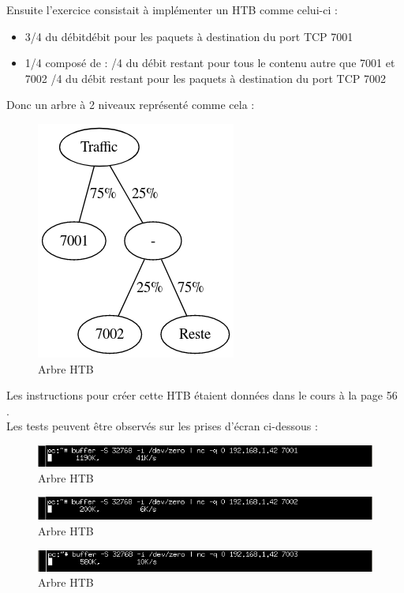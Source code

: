 \documentclass{article}
\begin{document}
Ensuite l'exercice consistait à implémenter un HTB comme celui-ci : \\

\begin{itemize}
	\item 3/4 du débitdébit pour les paquets à destination du port TCP 7001
	\item 1/4 composé de : 
	/4 du débit restant pour tous le contenu autre que 7001 et 7002
	/4 du débit restant pour les paquets à destination du port TCP 7002
\end{itemize}

Donc un arbre à 2 niveaux représenté comme cela :

\begin{figure}[h]
	\centering
	\includegraphics{./arbre-htb.png}
	\caption{Arbre HTB}
	\label{fig:htb-tree}
\end{figure}
\newpage

Les instructions pour créer cette HTB étaient données dans le cours à la page 56 \cite{doc-labo}. \\

Les tests peuvent être observés sur les prises d'écran ci-dessous : 

\begin{figure}[h]
	\centering
	\includegraphics{./captures/htb1.png}
	\caption{Arbre HTB}
	\label{fig:Débit port 7001}
\end{figure}
\begin{figure}[h]
	\centering
	\includegraphics{./captures/htb2.png}
	\caption{Arbre HTB}
	\label{fig:Débit port 7002}
\end{figure}
\begin{figure}[h]
	\centering
	\includegraphics{./captures/htb3.png}
	\caption{Arbre HTB}
	\label{fig:Débit port 7003}
\end{figure}
\newpage
\end{document}
